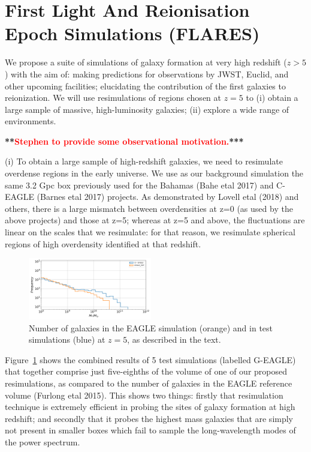 \documentclass[a4paper,11pt]{article}
\newcommand{\red}[1]{{\textcolor{red}{#1}}}
\newcommand{\todo}[1]{{\bf ***\red{#1}***}}
\begin{document}
\section*{First Light And Reionisation Epoch Simulations (FLARES)}

We propose a suite of simulations of galaxy formation at very high redshift
($z>5$) with the aim of: making predictions for observations by JWST, Euclid, and
other upcoming facilities; elucidating the contribution of the first galaxies to
reionization.  We will use resimulations of regions chosen at $z=5$ to (i) obtain
a large sample of massive, high-luminosity galaxies; (ii) explore a wide range
of environments.

\todo{Stephen to provide some observational motivation.}

(i) To obtain a large sample of high-redshift galaxies, we need to resimulate
overdense regions in the early universe.  We use as our background simulation
the same 3.2 Gpc box previously used for the Bahamas (Bahe etal 2017) and
C-EAGLE (Barnes etal 2017) projects.  As demonstrated by Lovell etal (2018) and
others, there is a large mismatch between overdensities at z=0 (as used by the
above projects) and those at z=5; whereas at z=5 and above, the fluctuations are
linear on the scales that we resimulate: for that reason, we resimulate
spherical regions of high overdensity identified at that redshift.

\begin{figure}
  \centering
  \vspace*{-0.9cm}
  \includegraphics[width=0.48\textwidth]{FLARES_ngal.png}
  \caption{Number of galaxies in the EAGLE simulation (orange) and in test
    simulations (blue) at $z=5$, as described in the text.}
  \label{fig:FLARES_ngal}
\end{figure}

Figure~\ref{fig:FLARES_ngal} shows the combined results of 5 test simulations
(labelled G-EAGLE) that together comprise just five-eighths of the volume of one
of our proposed resimulations, as compared to the number of galaxies in the
EAGLE reference volume (Furlong etal 2015).  This shows two things: firstly that
resimulation technique is extremely efficient in probing the sites of galaxy
formation at high redshift; and secondly that it probes the highest mass
galaxies that are simply not present in smaller boxes which fail to sample the
long-wavelength modes of the power spectrum.
\end{document}

